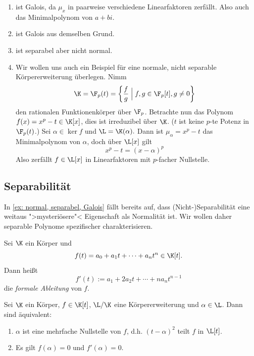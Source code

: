 \documentclass[11pt, a4paper]{article}
\begin{document}
\begin{example}  \label{ex: normal, separabel, Galois} \mbox{}
    \begin{enumerate}[label=(\roman*)]
        \item ist Galois, da $\mu_x$ in paarweise verschiedene Linearfaktoren zerfällt. Also auch das Minimalpolynom von $a+bi$.
        \item ist Galois aus demselben Grund.
        \item ist separabel aber nicht normal.
        \item Wir wollen uns auch ein Beispiel für eine normale, nicht separable Körpererweiterung überlegen. Nimm 
        $$\K= \F_p (t) = \left\{\frac{f}{g}\; \Big| \; f,g\in \F_p[t], g\neq 0\right\}$$
        den rationalen Funktionenkörper über $\F_p$. Betrachte nun das Polynom $f(x) = x^p - t \in \K[x]$, dies ist irreduzibel über $\K$. ($t$ ist keine $p$-te Potenz in $\F_p(t)$.) Sei $\alpha\in \ker f$ und $\L=\K(\alpha).$ Dann ist  $\mu_\alpha = x^p-t$ das Minimalpolynom von $\alpha$, doch über $\L[x]$ gilt 
        $$x^p -t = (x-\alpha)^p$$
        Also zerfällt $f\in \L[x]$ in Linearfaktoren mit $p$-facher Nullstelle.
        
    \end{enumerate}
\end{example}

\subsection{Separabilität}

\begin{note}In \ref{ex: normal, separabel, Galois} fällt bereits auf, dass (Nicht-)Separabilität eine weitaus ">mysteriösere"< Eigenschaft als Normalität ist. Wir wollen daher separable Polynome spezifischer charakterisieren. 
\end{note}

\begin{definition}
    Sei $\K$ ein Körper und
    $$f(t) = a_0 + a_1t + \cdots + a_nt^n \in \K[t].$$
    Dann heißt
    $$f'(t) := a_1 + 2a_2t + \cdots + na_nt^{n-1}$$
    die \emph{formale Ableitung} von $f$.
\end{definition}

\begin{lemma}
    Sei $\K$ ein Körper, $f \in \K[t]$, $\L/\K$ eine Körpererweiterung und $\alpha \in \L$. Dann sind äquivalent:
    \begin{enumerate}[label=(\roman*)]
        \item $\alpha$ ist eine mehrfache Nullstelle von $f$, d.h. $(t-\alpha)^2$ teilt $f$ in $\L[t]$.
        \item Es gilt $f(\alpha) = 0$ und $f'(\alpha) = 0.$
    \end{enumerate}
\end{lemma}
\end{document}
